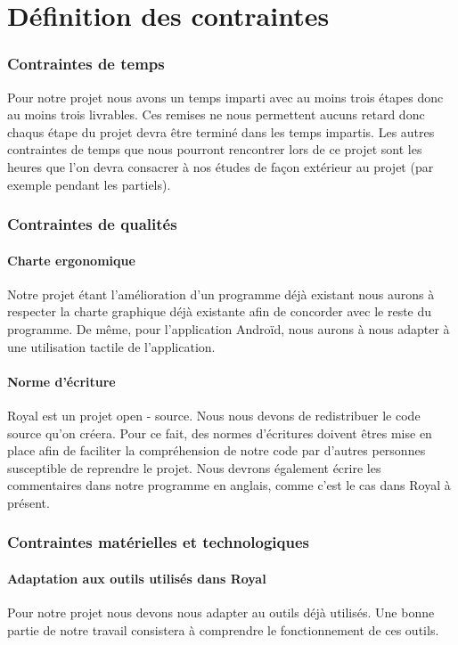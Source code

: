 \part{Définition des contraintes}


\section{Contraintes de temps}
Pour notre projet nous avons un temps imparti avec au moins trois étapes donc au moins trois livrables. Ces remises ne nous permettent aucuns retard donc chaqus étape du projet devra être terminé dans les temps impartis.
Les autres contraintes de temps que nous pourront rencontrer lors de ce projet sont les heures que l'on devra consacrer à nos études de façon extérieur au projet (par exemple pendant les partiels). 

\section{Contraintes de qualités}

\subsection{Charte ergonomique}
Notre projet étant l'amélioration d'un programme déjà existant nous aurons à respecter la charte graphique déjà existante afin de concorder avec le reste du programme. 
De même, pour l'application Androïd, nous aurons à nous adapter à une utilisation tactile de l'application. 

\subsection{Norme d'écriture}
Royal est un projet open - source. 
Nous nous devons de redistribuer le code source qu'on créera.
Pour ce fait, des normes d'écritures doivent êtres mise en place afin de faciliter la compréhension de notre code par d'autres personnes susceptible de reprendre le projet. 
Nous devrons également écrire les commentaires dans notre programme en anglais, comme c'est le cas dans Royal à présent.

\section{Contraintes matérielles et technologiques}

\subsection{Adaptation aux outils utilisés dans Royal}
Pour notre projet nous devons nous adapter au outils déjà utilisés. Une bonne partie de notre travail consistera à comprendre le fonctionnement de ces outils.

